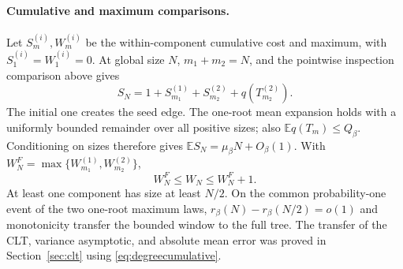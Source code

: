 \documentclass[runningheads,envcountsame,orivec]{llncs}
\newcommand{\E}{\mathbb E}
\begin{document}
\paragraph{Cumulative and maximum comparisons.}
Let $S_m^{(i)},W_m^{(i)}$ be the within-component cumulative cost
and maximum, with $S_1^{(i)}=W_1^{(i)}=0$.
At global size $N$, $m_1+m_2=N$, and the pointwise inspection
comparison above gives
\begin{equation}\label{eq:degreecumulative}
 S_N=1+S_{m_1}^{(1)}+S_{m_2}^{(2)}+q(T_{m_2}^{(2)}).
\end{equation}
The initial one creates the seed edge. The one-root mean expansion
holds with a uniformly bounded remainder over all positive sizes;
also $\E q(T_m)\le Q_\beta$. Conditioning on sizes therefore gives
$\E S_N=\mu_\beta N+O_\beta(1)$.
With $W_N^F=\max\{W_{m_1}^{(1)},W_{m_2}^{(2)}\}$,
\begin{equation}\label{eq:degreemaximum}
 W_N^F\le W_N\le W_N^F+1.
\end{equation}
At least one component has size at least $N/2$. On the common
probability-one event of the two one-root maximum laws,
$r_\beta(N)-r_\beta(N/2)=o(1)$ and monotonicity transfer the
bounded window to the full tree. The transfer of the CLT, variance
asymptotic, and absolute mean error was proved in
Section~\ref{sec:clt} using \eqref{eq:degreecumulative}.
\end{document}
